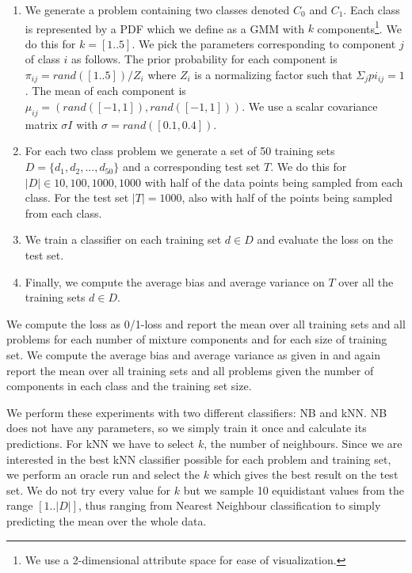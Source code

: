 \documentclass[a4paper]{article}
\begin{document}
\begin{enumerate}
\item We generate a problem containing two classes denoted $C_0$ and $C_1$. Each class is represented by a \ac{PDF} which we define as a \ac{GMM} with $k$ components\footnote{We use a 2-dimensional attribute space for ease of visualization.}. We do this for $k = [1 .. 5]$. We pick the parameters corresponding to component $j$ of class $i$ as follows. The prior probability for each component is $\pi_{ij} = rand([1 .. 5]) / Z_i$ where $Z_i$ is a normalizing factor such that $\Sigma_{j} pi_{ij} = 1$. The mean of each component is $\mu_{ij} = (rand([-1,1]),rand([-1,1]))$. We use a scalar covariance matrix $\sigma I$ with $\sigma = rand([0.1,0.4])$.
\item For each two class problem we generate a set of 50 training sets $D = \{d_1, d_2, ..., d_{50}\}$ and a corresponding test set $T$. We do this for $|D| \in {10, 100, 1000, 1000}$ with half of the data points being sampled from each class. For the test set $|T| = 1000$, also with half of the points being sampled from each class.
\item We train a classifier on each training set $d \in D$ and evaluate the loss on the test set.
\item Finally, we compute the average bias and average variance on $T$ over all the training sets $d \in D$.
\end{enumerate}

We compute the loss as 0/1-loss and report the mean over all training sets and all problems for each number of mixture components and for each size of training set. We compute the average bias and average variance as given in \cite{Domingos2000} and again report the mean over all training sets and all problems given the number of components in each class and the training set size.

We perform these experiments with two different classifiers: \ac{NB} and \ac{kNN}. \ac{NB} does not have any parameters, so we simply train it once and calculate its predictions. For \ac{kNN} we have to select $k$, the number of neighbours. Since we are interested in the best \ac{kNN} classifier possible for each problem and training set, we perform an oracle run and select the $k$ which gives the best result on the test set. We do not try every value for $k$ but we sample 10 equidistant values from the range $[1 .. |D|]$, thus ranging from Nearest Neighbour classification to simply predicting the mean over the whole data.
\end{document}

